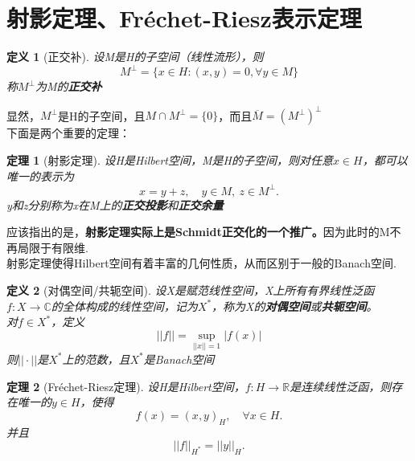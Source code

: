 \documentclass[12pt, a4paper, oneside, fontset=windows]{ctexbook}
\newtheorem{theorem}{定理}[section]
\newtheorem{definition}{定义}[section]
\begin{document}
\section{射影定理、Fréchet-Riesz表示定理}

    \begin{definition}[正交补]
        设M是H的子空间（线性流形），则
        \[
            M^{\perp}=\{x\in H:(x,y)=0,\forall y\in M\}
        \]
        称$M^{\perp}$为M的\textbf{正交补} 
    \end{definition}
    显然，$M^{\perp}$是H的子空间，且$M\cap M^{\perp}=\{0\}$，而且$\overline{M}={(M^{\perp})}^{\perp}$\\
    下面是两个重要的定理：
    \begin{theorem}[射影定理]
        设H是Hilbert空间，M是H的子空间，则对任意$x\in H$，都可以唯一的表示为
        \[x=y+z,\quad y\in M,\ z\in M^{\perp}.\]
        y和z分别称为x在M上的\textbf{正交投影}和\textbf{正交余量}
    \end{theorem}
    应该指出的是，{\bf 射影定理实际上是Schmidt正交化的一个推广。}因为此时的M不再局限于有限维.\\
    射影定理使得Hilbert空间有着丰富的几何性质，从而区别于一般的Banach空间.\\

    \begin{definition}[对偶空间/共轭空间]
        设X是赋范线性空间，X上所有有界线性泛函$f:X\to \mathbb{C}$的全体构成的线性空间，记为$X^*$，称为X的\textbf{对偶空间}或\textbf{共轭空间}。\\
        对$f\in X^*$，定义
        \[
            ||f||=\sup_{||x||=1}|f(x)|
        \]
        则$||\cdot ||$是$X^*$上的范数，且$X^*$是Banach空间
        
    \end{definition}

    \begin{theorem}[Fréchet-Riesz定理]
        设H是Hilbert空间，$f:H\to \mathbb{R}$是连续线性泛函，则存在唯一的$y\in H$，使得
        \[f(x)={(x,y)}_H,\quad \forall x\in H.\]
        并且
        \[||f||_{H^*}=||y||_H.\]
    \end{theorem}

















    
\end{document}
